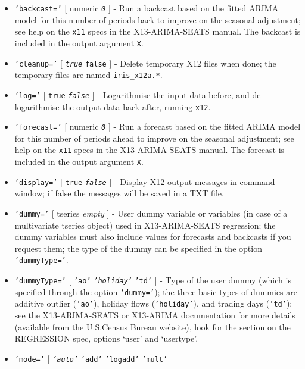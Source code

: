 \begin{itemize}
\item
  \texttt{'backcast='} {[} numeric \textbar{} \emph{\texttt{0}} {]} -
  Run a backcast based on the fitted ARIMA model for this number of
  periods back to improve on the seasonal adjustment; see help on the
  \texttt{x11} specs in the X13-ARIMA-SEATS manual. The backcast is
  included in the output argument \texttt{X}.
\item
  \texttt{'cleanup='} {[} \emph{\texttt{true}} \textbar{} \texttt{false}
  {]} - Delete temporary X12 files when done; the temporary files are
  named \texttt{iris\_x12a.*}.
\item
  \texttt{'log='} {[} \texttt{true} \textbar{} \emph{\texttt{false}} {]}
  - Logarithmise the input data before, and de-logarithmise the output
  data back after, running \texttt{x12}.
\item
  \texttt{'forecast='} {[} numeric \textbar{} \emph{\texttt{0}} {]} -
  Run a forecast based on the fitted ARIMA model for this number of
  periods ahead to improve on the seasonal adjustment; see help on the
  \texttt{x11} specs in the X13-ARIMA-SEATS manual. The forecast is
  included in the output argument \texttt{X}.
\item
  \texttt{'display='} {[} \texttt{true} \textbar{} \emph{\texttt{false}}
  {]} - Display X12 output messages in command window; if false the
  messages will be saved in a TXT file.
\item
  \texttt{'dummy='} {[} tseries \textbar{} \emph{empty} {]} - User dummy
  variable or variables (in case of a multivariate tseries object) used
  in X13-ARIMA-SEATS regression; the dummy variables must also include
  values for forecasts and backcasts if you request them; the type of
  the dummy can be specified in the option \texttt{'dummyType='}.
\item
  \texttt{'dummyType='} {[} \texttt{'ao'} \textbar{}
  \emph{\texttt{'holiday'}} \textbar{} \texttt{'td'} {]} - Type of the
  user dummy (which is specified through the option \texttt{'dummy='});
  the three basic types of dummies are additive outlier (\texttt{'ao'}),
  holiday flows (\texttt{'holiday'}), and trading days (\texttt{'td'});
  see the X13-ARIMA-SEATS or X13-ARIMA documentation for more details
  (available from the U.S.Census Bureau website), look for the section
  on the REGRESSION spec, options `user' and `usertype'.
\item
  \texttt{'mode='} {[} \emph{\texttt{'auto'}} \textbar{} \texttt{'add'}
  \textbar{} \texttt{'logadd'} \textbar{} \texttt{'mult'} \textbar{}

\end{itemize}
